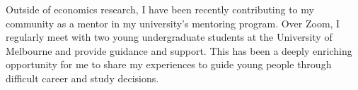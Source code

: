 Outside of economics research, I have been recently contributing to my community as a mentor in my university's mentoring program. Over Zoom, I regularly meet with two young undergraduate students at the University of Melbourne and provide guidance and support. This has been a deeply enriching opportunity for me to share my experiences to guide young people through difficult career and study decisions.